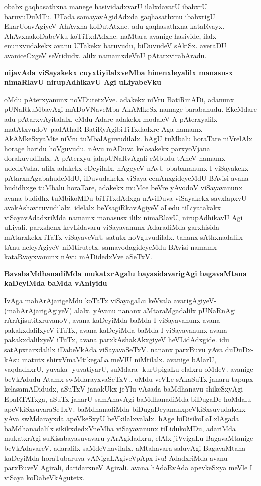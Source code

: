 obabx gaqhasathxna manege hasividadxvarU ilalxdavarU ibabxrU baruvuDuMTu. UTada samayavAgidAdxda gaqhasathxnu ibabxrigU EkarUoavAgiyeV AhAvxna koDutAtxne. adu gaqhasathxna kataRvayx. AhAvxnakoDabeVku koTiTxdAdxne. naMtara avanige hasivide, ilalx enunxvudakekx avanu UTakekx baruvudu, biDuvudeV sAkiSx. averaDU avaniceCxgeV seVridudx. alilx namamxdeVnU pAtarxvirabAradu.

{\bf nijavAda viSayakekx cuyxtiyilalxveMba hinenxleyalilx manasusx nimaRlavU nirupAdhikavU Agi uLiyabeVku}

oMdu pAterxyanunx noVDutetxVve. adakekx niVru BatiRmADi, adanunx pUNaRkuMbavAgi mADoVNaveMba AkAMkeSx namage barabahudu. EkeMdare adu pAtarxvAyitalalx. eMdu Adare adakekx modaleV A pAterxyalilx matAtxvudoV padAthaR BatiRyAgibiTiTxdadxre Aga namamx AkAMkeSxyaMte niVru tuMbalAguvudilalx. hAgU tuMbalu horaTare niVrelAlx horage haridu hoVguvudu. nAvu mADuva kelasakekx parxyoVjana dorakuvudilalx. A pAterxyu jalapUNaRvAgali eMbudu tAneV namamx udedxVsha. alilx adakekx eDeyilalx. hAgeyeV nAvU obabxnanunx I viSayakekx pAtarxnAgabahudeMdU, iDuvudakekx viSaya cenAnxgideyeMdU BAvisi avana budidhxge tuMbalu horaTare, adakekx muMce beVre yAvodoV viSayavanunx avana budidhx tuMbikoMDu biTiTxdAdxga nAviDuva viSayakekx savxlapxvU avakAshaviruvudilalx. idelalx beYsagiRkavAgiyeV aLedu tiLiyatakakx viSayavAdadxriMda namamx manasusx ililx nimaRlavU, nirupAdhikavU Agi uLiyali. parxshenx kevLidavaru viSayavanunx AdaradiMda garxhisida mAtarxkekx iTaTx viSayaveVnU satutx hoVguvudilalx. tananx sAthxnadalilx tAnu neleyAgiyeV niMtirutetx. samavodagideyeMdu BAvisi namamx kataRvayxvanunx nAvu mADidedxVve aSeTxV.

{\bf BavabaMdhanadiMda mukatxrAgalu bayasidavarigAgi bagavaMtana kaDeyiMda baMda vAniyidu}

IvAga mahArAjarigeMdu koTaTx viSayagaLu keVvala avarigAgiyeV- (mahArAjarigAgiyeV) alalx. yAvanu nananx aMtaraMgadalilx pUNaRnAgi rArAjisutitxruvanoV, avana kaDeyiMda baMda I viSayavanunx avana pakakxdalilxyeV iTuTx, avana kaDeyiMda baMda I viSayavanunx avana pakakxdalilxyeV iTuTx, avana parxkAshakAkxgiyeV heVLidAdxgide. idu satApxtarxdalilx iDabeVkAda viSayavaSeTxV. nananx parxBuvu yAva duDuDx- kAsu matutx shirxVmaMtikegaLa meVlU niMtilalx. avanige bAlarU, vaqdadhxrU, yuvaka- yuvatiyarU, suMdara- kurUpigaLu elalxru oMdeV. avanige beVkAdudu Atamx swMdarayxvaSeTxV.. oMdu veVLe sAkaSuTx janaru tapupx kelasamADidudx, aSuTxV janakUkx jeYlu vAsada baMdhanavu shikeSxyAgi EpaRTATxga, aSuTx janarU samAnavAgi baMdhanadiMda biDugaDe hoMdalu apeVkiSxsuvaraSeTxV. baMdhanadiMda biDugaDeyananxpeVkiSxsuvudakekx yAva swMdarayxda apeVkeSxyU beVkilalxvalalx. hAge biDisikoLaLxlAgada baMdhanadalilx sikikxdedxVneMba viSayavanunx tiLidukoMDu, adariMda mukatxrAgi suKisabayasuvavaru yArAgidadxru, elAlx jiVvigaLu BagavaMtanige beVkAdavareV. adaralilx saMdeVhavilalx. aMtahavara saluvAgi BagavaMtana kaDeyiMda horaTubaruva vANigaLAgiveVpApx ivu! AdadxriMda avanu parxBuveV Agirali, daridarxneV Agirali. avana hAdaRvAda apevkeSxya meVle I viSaya koDabeVkAgutetx.


